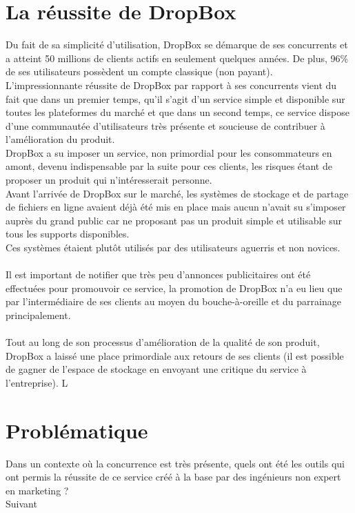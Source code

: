 \documentclass[a4paper, 10pt]{article}
\begin{document}
\section*{La r\'eussite de DropBox}
Du fait de sa simplicit\'e d'utilisation, DropBox se d\'emarque de ses concurrents et
a atteint 50 millions de clients actifs en seulement quelques ann\'ees.
De plus, 96\% de ses utilisateurs poss\`edent un compte classique (non payant).\\
L'impressionnante r\'eussite de DropBox par rapport \`a ses concurrents vient du fait que dans un premier temps,
qu'il s'agit d'un service simple et disponible sur toutes les plateformes du march\'e et
que dans un second temps, ce service dispose d'une communaut\'ee d'utilisateurs tr\`es pr\'esente et soucieuse
de contribuer \`a l'am\'elioration du produit.\\
DropBox a su imposer un service, non primordial pour les consommateurs en amont, devenu indispensable par la suite pour ces clients,
les risques \'etant de proposer un produit qui n'int\'eresserait personne.\\
Avant l'arriv\'ee de DropBox sur le march\'e, les syst\`emes de stockage et de partage de fichiers en ligne avaient d\'ej\`a \'et\'e mis en place
mais aucun n'avait su s'imposer aupr\`es du grand public car ne proposant pas un produit simple et utilisable sur tous les supports disponibles.\\
Ces syst\`emes \'etaient plut\^ot utilis\'es par des utilisateurs aguerris et non novices.\\ \\
Il est important de notifier que tr\`es peu d'annonces publicitaires ont \'et\'e effectu\'ees pour promouvoir ce service,
la promotion de DropBox n'a eu lieu que par l'interm\'ediaire de ses clients au moyen du bouche-\`a-oreille et du parrainage principalement.\\ \\
Tout au long de son processus d'am\'elioration de la qualit\'e de son produit, DropBox a laiss\'e une place primordiale aux retours de ses clients
(il est possible de gagner de l'espace de stockage en envoyant une critique du service \`a l'entreprise).
L


\section*{Probl\'ematique}
Dans un contexte o\`u la concurrence est tr\`es pr\'esente, quels ont \'et\'e les outils qui ont permis la r\'eussite de ce service
cr\'e\'e \`a la base par des ing\'enieurs non expert en marketing ?\\
Suivant
\end{document}
